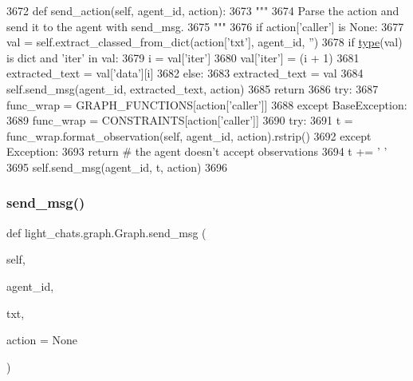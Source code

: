 \begin{DoxyCode}
3672     \textcolor{keyword}{def }send\_action(self, agent\_id, action):
3673         \textcolor{stringliteral}{"""}
3674 \textcolor{stringliteral}{        Parse the action and send it to the agent with send\_msg.}
3675 \textcolor{stringliteral}{        """}
3676         \textcolor{keywordflow}{if} action[\textcolor{stringliteral}{'caller'}] \textcolor{keywordflow}{is} \textcolor{keywordtype}{None}:
3677             val = self.extract\_classed\_from\_dict(action[\textcolor{stringliteral}{'txt'}], agent\_id, \textcolor{stringliteral}{''})
3678             \textcolor{keywordflow}{if} \hyperlink{namespaceparlai_1_1agents_1_1tfidf__retriever_1_1build__tfidf_ad5dfae268e23f506da084a9efb72f619}{type}(val) \textcolor{keywordflow}{is} dict \textcolor{keywordflow}{and} \textcolor{stringliteral}{'iter'} \textcolor{keywordflow}{in} val:
3679                 i = val[\textcolor{stringliteral}{'iter'}]
3680                 val[\textcolor{stringliteral}{'iter'}] = (i + 1) %
3681                 extracted\_text = val[\textcolor{stringliteral}{'data'}][i]
3682             \textcolor{keywordflow}{else}:
3683                 extracted\_text = val
3684             self.send\_msg(agent\_id, extracted\_text, action)
3685             \textcolor{keywordflow}{return}
3686         \textcolor{keywordflow}{try}:
3687             func\_wrap = GRAPH\_FUNCTIONS[action[\textcolor{stringliteral}{'caller'}]]
3688         \textcolor{keywordflow}{except} BaseException:
3689             func\_wrap = CONSTRAINTS[action[\textcolor{stringliteral}{'caller'}]]
3690         \textcolor{keywordflow}{try}:
3691             t = func\_wrap.format\_observation(self, agent\_id, action).rstrip()
3692         \textcolor{keywordflow}{except} Exception:
3693             \textcolor{keywordflow}{return}  \textcolor{comment}{# the agent doesn't accept observations}
3694         t += \textcolor{stringliteral}{' '}
3695         self.send\_msg(agent\_id, t, action)
3696 
\end{DoxyCode}
\mbox{\label{classlight__chats_1_1graph_1_1Graph_a966d3719771ddc58c520f0821c18d959}} 
\subsubsection{\texorpdfstring{send\+\_\+msg()}{send\_msg()}}
{\footnotesize\ttfamily def light\+\_\+chats.\+graph.\+Graph.\+send\+\_\+msg (\begin{DoxyParamCaption}\item[{}]{self,  }\item[{}]{agent\+\_\+id,  }\item[{}]{txt,  }\item[{}]{action = {\ttfamily None} }\end{DoxyParamCaption})}

